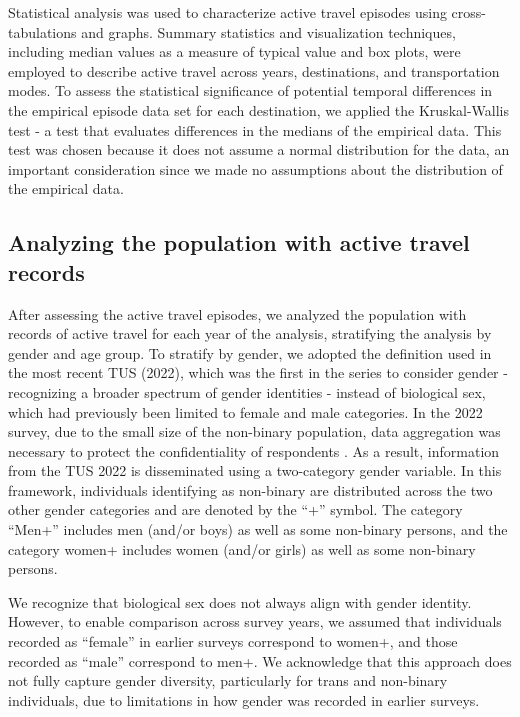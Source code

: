 \documentclass[preprint, 3p,
authoryear]{elsarticle} %
\begin{document}
Statistical analysis was used to characterize active travel episodes
using cross-tabulations and graphs. Summary statistics and visualization
techniques, including median values as a measure of typical value and
box plots, were employed to describe active travel across years,
destinations, and transportation modes. To assess the statistical
significance of potential temporal differences in the empirical episode
data set for each destination, we applied the Kruskal-Wallis test - a
test that evaluates differences in the medians of the empirical data.
This test was chosen because it does not assume a normal distribution
for the data, an important consideration since we made no assumptions
about the distribution of the empirical data.

\subsection{Analyzing the population with active travel
records}\label{analyzing-the-population-with-active-travel-records}

After assessing the active travel episodes, we analyzed the population
with records of active travel for each year of the analysis, stratifying
the analysis by gender and age group. To stratify by gender, we adopted
the definition used in the most recent TUS (2022), which was the first
in the series to consider gender - recognizing a broader spectrum of
gender identities - instead of biological sex, which had previously been
limited to female and male categories. In the 2022 survey, due to the
small size of the non-binary population, data aggregation was necessary
to protect the confidentiality of respondents
\citep{statisticscanada2025}. As a result, information from the TUS 2022
is disseminated using a two-category gender variable. In this framework,
individuals identifying as non-binary are distributed across the two
other gender categories and are denoted by the ``+'' symbol. The
category ``Men+'' includes men (and/or boys) as well as some non-binary
persons, and the category women+ includes women (and/or girls) as well
as some non-binary persons.

We recognize that biological sex does not always align with gender
identity. However, to enable comparison across survey years, we assumed
that individuals recorded as ``female'' in earlier surveys correspond to
women+, and those recorded as ``male'' correspond to men+. We
acknowledge that this approach does not fully capture gender diversity,
particularly for trans and non-binary individuals, due to limitations in
how gender was recorded in earlier surveys.
\end{document}
